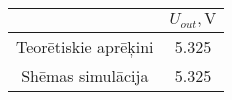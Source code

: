 \begin{center}
    \begin{tabular}{|c|c|}
    \hline
    &$U_{out}, \mathrm{V}$\\
    \hline
    Teorētiskie aprēķini&5.325\\
    \hline
    Shēmas simulācija&5.325\\
    \hline
    \end{tabular}
\end{center}